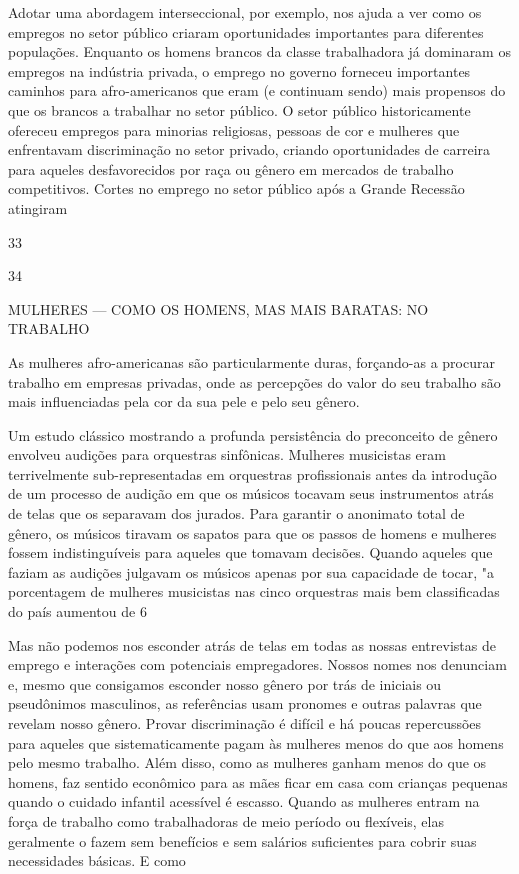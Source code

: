  \par 
Adotar uma abordagem interseccional, por exemplo, nos ajuda a ver como os empregos no setor público criaram oportunidades importantes para diferentes populações. Enquanto os homens brancos da classe trabalhadora já dominaram os empregos na indústria privada, o emprego no governo forneceu importantes caminhos para afro-americanos que eram (e continuam sendo) mais propensos do que os brancos a trabalhar no setor público. O setor público historicamente ofereceu empregos para minorias religiosas, pessoas de cor e mulheres que enfrentavam discriminação no setor privado, criando oportunidades de carreira para aqueles desfavorecidos por raça ou gênero em mercados de trabalho competitivos. Cortes no emprego no setor público após a Grande Recessão atingiram
 \par 
33
 \par 
34
 \par 
MULHERES — COMO OS HOMENS, MAS MAIS BARATAS: NO TRABALHO
 \par 
As mulheres afro-americanas são particularmente duras, forçando-as a procurar trabalho em empresas privadas, onde as percepções do valor do seu trabalho são mais influenciadas pela cor da sua pele e pelo seu gênero.
 \par 
Um estudo clássico mostrando a profunda persistência do preconceito de gênero envolveu audições para orquestras sinfônicas. Mulheres musicistas eram terrivelmente sub-representadas em orquestras profissionais antes da introdução de um processo de audição em que os músicos tocavam seus instrumentos atrás de telas que os separavam dos jurados. Para garantir o anonimato total de gênero, os músicos tiravam os sapatos para que os passos de homens e mulheres fossem indistinguíveis para aqueles que tomavam decisões. Quando aqueles que faziam as audições julgavam os músicos apenas por sua capacidade de tocar, "a porcentagem de mulheres musicistas nas cinco orquestras mais bem classificadas do país aumentou de 6%
 \par 
Mas não podemos nos esconder atrás de telas em todas as nossas entrevistas de emprego e interações com potenciais empregadores. Nossos nomes nos denunciam e, mesmo que consigamos esconder nosso gênero por trás de iniciais ou pseudônimos masculinos, as referências usam pronomes e outras palavras que revelam nosso gênero. Provar discriminação é difícil e há poucas repercussões para aqueles que sistematicamente pagam às mulheres menos do que aos homens pelo mesmo trabalho. Além disso, como as mulheres ganham menos do que os homens, faz sentido econômico para as mães ficar em casa com crianças pequenas quando o cuidado infantil acessível é escasso. Quando as mulheres entram na força de trabalho como trabalhadoras de meio período ou flexíveis, elas geralmente o fazem sem benefícios e sem salários suficientes para cobrir suas necessidades básicas. E como
